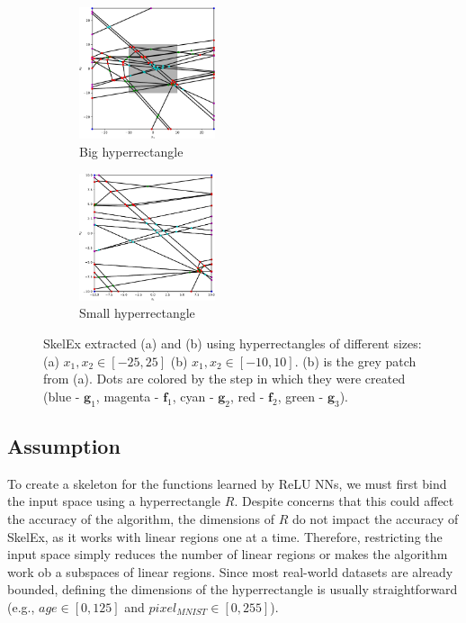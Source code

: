 \documentclass{article}
\begin{document}
\begin{figure}[t]
    \begin{subfigure}{4cm}
        \centering
        \includegraphics[width=4cm]{Figures/big_hyperrectangle.pdf}
        \caption{Big hyperrectangle}
        \label{fig:big_hyperrectangle}
    \end{subfigure}
    \begin{subfigure}{4cm}
        \centering
        \includegraphics[width=4cm]{Figures/small_hyperrectangle.pdf}
        \caption{Small hyperrectangle}
        \label{fig:small_hyperrectangle}
    \end{subfigure}
    \caption{SkelEx extracted (a) and (b) using hyperrectangles of different sizes: (a) $x_1, x_2 \in [-25, 25]$ (b) $x_1, x_2 \in [-10, 10]$. (b) is the grey patch from (a). Dots are colored by the step in which they were created (blue - $\mathbf{g}_1$, magenta - $\mathbf{f}_1$, cyan - $\mathbf{g}_2$, red - $\mathbf{f}_2$, green - $\mathbf{g}_3$).}
    \vspace{-3mm}
    \label{fig:hyperrectangle_theorem}
\end{figure}

\subsection{Assumption}

To create a skeleton for the functions learned by ReLU NNs, we must first bind the input space using a hyperrectangle $R$. Despite concerns that this could affect the accuracy of the algorithm, the dimensions of $R$ do not impact the accuracy of SkelEx, as it works with linear regions one at a time. Therefore, restricting the input space simply reduces the number of linear regions or makes the algorithm work ob a subspaces of linear regions. Since most real-world datasets are already bounded, defining the dimensions of the hyperrectangle is usually straightforward (e.g., $age\in [0, 125]$ and $pixel_{MNIST} \in [0, 255]$).
\end{document}
